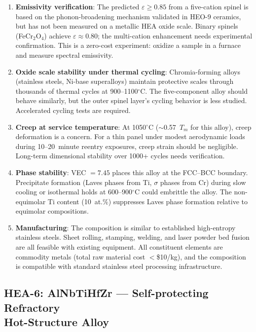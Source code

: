\documentclass[12pt,letterpaper]{article}
\theoremstyle{definition}
\begin{document}
\begin{enumerate}
  \item \textbf{Emissivity verification}: The predicted $\varepsilon \geq 0.85$ from a five-cation spinel is based on the phonon-broadening mechanism validated in HEO-9 ceramics, but has not been measured on a metallic HEA oxide scale.  Binary spinels (FeCr$_2$O$_4$) achieve $\varepsilon \approx 0.80$; the multi-cation enhancement needs experimental confirmation.  This is a zero-cost experiment: oxidize a sample in a furnace and measure spectral emissivity.

  \item \textbf{Oxide scale stability under thermal cycling}: Chromia-forming alloys (stainless steels, Ni-base superalloys) maintain protective scales through thousands of thermal cycles at 900--1100$^\circ$C.  The five-component alloy should behave similarly, but the outer spinel layer's cycling behavior is less studied.  Accelerated cycling tests are required.

  \item \textbf{Creep at service temperature}: At 1050$^\circ$C ($\sim$0.57~$T_m$ for this alloy), creep deformation is a concern.  For a thin panel under modest aerodynamic loads during 10--20~minute reentry exposures, creep strain should be negligible.  Long-term dimensional stability over 1000+ cycles needs verification.

  \item \textbf{Phase stability}: VEC $= 7.45$ places this alloy at the FCC--BCC boundary.  Precipitate formation (Laves phases from Ti, $\sigma$ phases from Cr) during slow cooling or isothermal holds at 600--900$^\circ$C could embrittle the alloy.  The non-equimolar Ti content (10~at.\%) suppresses Laves phase formation relative to equimolar compositions.

  \item \textbf{Manufacturing}: The composition is similar to established high-entropy stainless steels.  Sheet rolling, stamping, welding, and laser powder bed fusion are all feasible with existing equipment.  All constituent elements are commodity metals (total raw material cost $<$\$10/kg), and the composition is compatible with standard stainless steel processing infrastructure.
\end{enumerate}


\subsection[HEA-6: Self-protecting refractory hot-structure alloy]{HEA-6: AlNbTiHfZr --- Self-protecting Refractory\\Hot-Structure Alloy}\label{sec:hea6}
\end{document}
